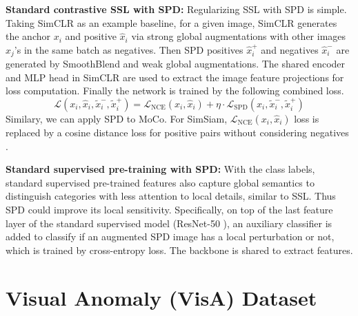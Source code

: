 \documentclass[runningheads]{llncs}
\begin{document}
\noindent\textbf{Standard contrastive SSL with SPD:} Regularizing SSL with SPD is simple. Taking SimCLR as an example baseline, for a given image, SimCLR generates the anchor $x_i$ and positive $\hat{x}_i$ via strong global augmentations with other images $x_j$'s in the same batch as negatives. Then SPD positives $\hat{x}_i^+$ and negatives $\hat{x}_i^-$ are generated by SmoothBlend and weak global augmentations. The shared encoder and MLP head in SimCLR are used to extract the image feature projections for loss computation. Finally the network is trained by the following combined loss.
\begin{equation}
    \mathcal{L}(x_i,\hat{x}_i,\tilde{x}_i^-,\tilde{x}_i^+) = \mathcal{L}_{\mathrm{NCE}}(x_i,\hat{x}_i) + \eta \cdot \mathcal{L}_{\mathrm{SPD}}(x_i,\tilde{x}_i^-,\tilde{x}_i^+)
\end{equation}
Similary, we can apply SPD to MoCo. For SimSiam, $\mathcal{L}_{\mathrm{NCE}}(x_i,\hat{x}_i)$ loss is replaced by a cosine distance loss for positive pairs without considering negatives \cite{chen2021exploring}.

\noindent\textbf{Standard supervised pre-training with SPD:} With the class labels, standard supervised pre-trained features also capture global semantics to distinguish categories with less attention to local details, similar to SSL. Thus SPD could improve its local sensitivity. Specifically, on top of the last feature layer of the standard supervised model (ResNet-50 \cite{he2016deep}), an auxiliary classifier is added to classify if an augmented SPD image has a local perturbation or not, which is trained by cross-entropy loss. The backbone is shared to extract features.
\section{Visual Anomaly (VisA) Dataset}
\end{document}
